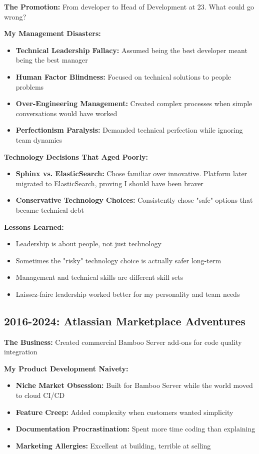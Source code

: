 \documentclass[10pt,a4paper]{article}
\begin{document}
\textbf{The Promotion:} From developer to Head of Development at 23. What could go wrong?

\textbf{My Management Disasters:}
\begin{itemize}[leftmargin=10pt,itemsep=1pt]
\item \textbf{Technical Leadership Fallacy:} Assumed being the best developer meant being the best manager
\item \textbf{Human Factor Blindness:} Focused on technical solutions to people problems
\item \textbf{Over-Engineering Management:} Created complex processes when simple conversations would have worked
\item \textbf{Perfectionism Paralysis:} Demanded technical perfection while ignoring team dynamics
\end{itemize}

\textbf{Technology Decisions That Aged Poorly:}
\begin{itemize}[leftmargin=10pt,itemsep=1pt]
\item \textbf{Sphinx vs. ElasticSearch:} Chose familiar over innovative. Platform later migrated to ElasticSearch, proving I should have been braver
\item \textbf{Conservative Technology Choices:} Consistently chose "safe" options that became technical debt
\end{itemize}

\textbf{Lessons Learned:}
\begin{itemize}[leftmargin=10pt,itemsep=1pt]
\item Leadership is about people, not just technology
\item Sometimes the "risky" technology choice is actually safer long-term
\item Management and technical skills are different skill sets
\item Laissez-faire leadership worked better for my personality and team needs
\end{itemize}

\subsection{2016-2024: Atlassian Marketplace Adventures}

\textbf{The Business:} Created commercial Bamboo Server add-ons for code quality integration

\textbf{My Product Development Naivety:}
\begin{itemize}[leftmargin=10pt,itemsep=1pt]
\item \textbf{Niche Market Obsession:} Built for Bamboo Server while the world moved to cloud CI/CD
\item \textbf{Feature Creep:} Added complexity when customers wanted simplicity
\item \textbf{Documentation Procrastination:} Spent more time coding than explaining
\item \textbf{Marketing Allergies:} Excellent at building, terrible at selling
\end{itemize}
\end{document}
